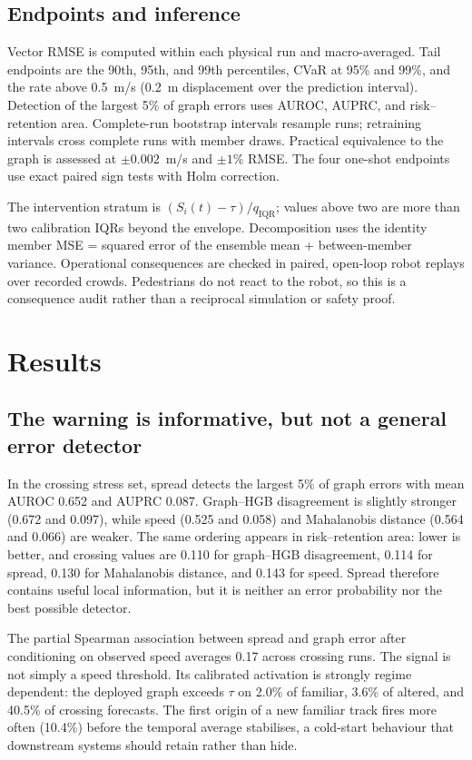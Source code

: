 \documentclass[preprint,11pt,authoryear]{elsarticle}
\begin{document}
\subsection{Endpoints and inference}
Vector RMSE is computed within each physical run and macro-averaged. Tail endpoints are the 90th, 95th, and 99th percentiles, CVaR at 95\% and 99\%, and the rate above 0.5~m/s (0.2~m displacement over the prediction interval). Detection of the largest 5\% of graph errors uses AUROC, AUPRC, and risk--retention area. Complete-run bootstrap intervals resample runs; retraining intervals cross complete runs with member draws. Practical equivalence to the graph is assessed at $\pm0.002$~m/s and $\pm1\%$ RMSE. The four one-shot endpoints use exact paired sign tests with Holm correction.

The intervention stratum is $(S_i(t)-\tau)/q_{\mathrm{IQR}}$; values above two are more than two calibration IQRs beyond the envelope. Decomposition uses the identity member MSE = squared error of the ensemble mean + between-member variance. Operational consequences are checked in paired, open-loop robot replays over recorded crowds. Pedestrians do not react to the robot, so this is a consequence audit rather than a reciprocal simulation or safety proof.

\section{Results}
\label{sec:results}
\subsection{The warning is informative, but not a general error detector}
In the crossing stress set, spread detects the largest 5\% of graph errors with mean AUROC 0.652 and AUPRC 0.087. Graph--HGB disagreement is slightly stronger (0.672 and 0.097), while speed (0.525 and 0.058) and Mahalanobis distance (0.564 and 0.066) are weaker. The same ordering appears in risk--retention area: lower is better, and crossing values are 0.110 for graph--HGB disagreement, 0.114 for spread, 0.130 for Mahalanobis distance, and 0.143 for speed. Spread therefore contains useful local information, but it is neither an error probability nor the best possible detector.

The partial Spearman association between spread and graph error after conditioning on observed speed averages 0.17 across crossing runs. The signal is not simply a speed threshold. Its calibrated activation is strongly regime dependent: the deployed graph exceeds $\tau$ on 2.0\% of familiar, 3.6\% of altered, and 40.5\% of crossing forecasts. The first origin of a new familiar track fires more often (10.4\%) before the temporal average stabilises, a cold-start behaviour that downstream systems should retain rather than hide.
\end{document}
